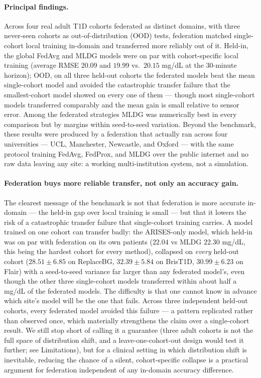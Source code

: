 \documentclass[10pt,letterpaper]{article}
\begin{document}
\paragraph{Principal findings.} Across four real adult T1D cohorts federated as
distinct domains, with three never-seen cohorts as out-of-distribution (OOD)
tests, federation matched single-cohort local training in-domain and transferred
more reliably out of it. Held-in, the global FedAvg and MLDG models were on par
with cohort-specific local training (average RMSE $20.09$ and $19.99$ vs.\
$20.15$ mg/dL at the 30-minute horizon); OOD, on all three held-out cohorts the
federated models beat the mean single-cohort model and avoided the catastrophic
transfer failure that the smallest-cohort model showed on every one of them ---
though most single-cohort models transferred comparably and the mean gain is
small relative to sensor error. Among the federated strategies MLDG was
numerically best in every comparison but by margins within seed-to-seed
variation. Beyond the benchmark, these results were produced by a federation that
actually ran across four universities --- UCL, Manchester, Newcastle, and Oxford
--- with the same protocol training FedAvg, FedProx, and MLDG over the public
internet and no raw data leaving any site: a working multi-institution system,
not a simulation.

\paragraph{Federation buys more reliable transfer, not only an accuracy gain.}
The clearest message of the benchmark is not that federation is more accurate
in-domain --- the held-in gap over local training is small --- but that it
lowers the risk of a catastrophic transfer failure that single-cohort training
carries. A model trained on one cohort can transfer badly: the ARISES-only
model, which held-in was on par with federation on its own patients ($22.04$ vs
MLDG $22.30$ mg/dL, this being the hardest cohort for every method), collapsed on
\emph{every} held-out cohort ($28.51 \pm 6.85$ on ReplaceBG, $32.39 \pm 5.84$ on
BrisT1D, $30.99 \pm 6.23$ on Flair) with a seed-to-seed variance far larger than
any federated model's, even though the other three single-cohort models
transferred within about half a mg/dL of the federated models. The difficulty is
that one cannot know in advance which site's model will be the one that fails.
Across three independent held-out cohorts, every federated model avoided this
failure --- a pattern replicated rather than observed once, which materially
strengthens the claim over a single-cohort result. We still stop short of calling
it a guarantee (three adult cohorts is not the full space of distribution shift,
and a leave-one-cohort-out design would test it further; see Limitations), but
for a clinical setting in which distribution shift is inevitable, reducing the
chance of a silent, cohort-specific collapse is a practical argument for
federation independent of any in-domain accuracy difference.
\end{document}
